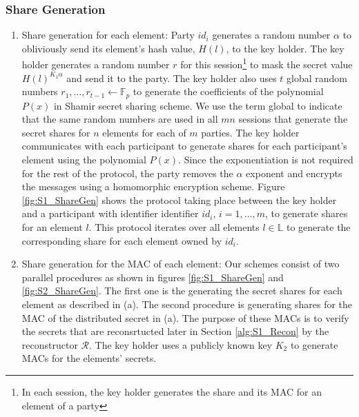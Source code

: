 \subsubsection{Share Generation}\label{ShareGen_S1}
\begin{enumerate}[label=(\alph*)]
    \item Share generation for each element: Party $id_i$ generates a random number $\alpha$ to obliviously send its element's hash value, $H(l)$, to the key holder. The key holder generates a random number $r$ for this session\footnote{In each session, the key holder generates the share and its MAC for an element of a party} to mask the secret value $H(l)^{K_1 \alpha}$ and send it to the party. The key holder also uses $t$ global random numbers $r_1, \dots, r_{t-1} \gets \mathbb{F}_p$ to generate the coefficients of the polynomial $P(x)$ in Shamir secret sharing scheme. We use the term global to indicate that the same random numbers are used in all $mn$ sessions that generate the secret shares for $n$ elements for each of $m$ parties. The key holder communicates with each participant to generate shares for each participant's element using the polynomial $P(x)$. Since the exponentiation is not required for the rest of the protocol, the party removes the $\alpha$ exponent and encrypts the messages using a homomorphic encryption scheme. Figure \ref{fig:S1_ShareGen} shows the protocol taking place between the key holder and a participant with identifier identifier $id_i$, $i =1, \dots, m$, to generate shares for an element $l$. This protocol iterates over all elements $l \in \mathbb{L}$ to generate the corresponding share for each element owned by $id_i$.
    \item Share generation for the MAC of each element: Our schemes consist of two parallel procedures as shown in figures \ref{fig:S1_ShareGen} and \ref{fig:S2_ShareGen}. The first one is the generating the secret shares for each element as described in (a). The second procedure is generating shares for the MAC of the distributed secret in (a). The purpose of these MACs is to verify the secrets that are reconsrtucted later in Section \ref{alg:S1_Recon} by the reconstructor $\mathcal{R}$. The key holder uses a publicly known key $K_2$ to generate MACs for the elements' secrets. 
\end{enumerate}


